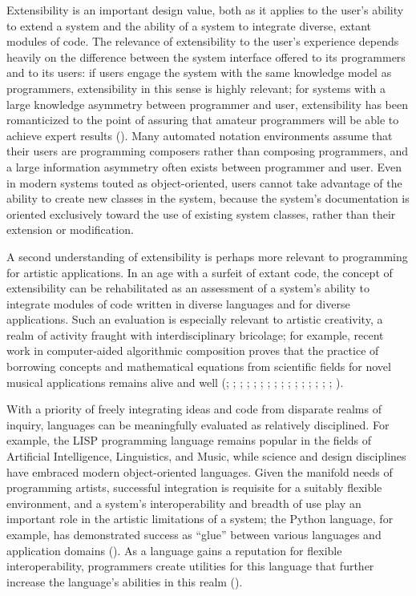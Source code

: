 Extensibility is an important design value, both as it applies to the user's ability to extend a system and the ability of a system to integrate diverse, extant modules of code. The relevance of extensibility to the user's experience depends heavily on the difference between the system interface offered to its programmers and to its users: if users engage the system with the same knowledge model as programmers, extensibility in this sense is highly relevant; for systems with a large knowledge asymmetry between programmer and user, extensibility has been romanticized to the point of assuring that amateur programmers will be able to achieve expert results (\cite{Standish:1975gd}). Many automated notation environments assume that their users are programming composers rather than composing programmers, and a large information asymmetry often exists between programmer and user. Even in modern systems touted as object-oriented, users cannot take advantage of the ability to create new classes in the system, because the system's documentation is oriented exclusively toward the use of existing system classes, rather than their extension or modification. 

A second understanding of extensibility is perhaps more relevant to programming for artistic applications. In an age with a surfeit of extant code, the concept of extensibility can be rehabilitated as an assessment of a system's ability to integrate modules of code written in diverse languages and for diverse applications. Such an evaluation is especially relevant to artistic creativity, a realm of activity fraught with interdisciplinary bricolage; for example, recent work in computer-aided algorithmic composition proves that the practice of borrowing concepts and mathematical equations from scientific fields for novel musical applications remains alive and well (\cite{Magnus2010}; \cite{Washka:zp}; \cite{Zad2005}; \cite{Acevedo2005}; \cite{Gartland-Jones2003}; \cite{Phon-Amnuaisuk1999}; \cite{Wiggins1998a}; \cite{MIRANDA2007}; \cite{Burraston2004}; \cite{Kroger}; \cite{Laine1988}; \cite{Hornel}; \cite{Melo2003}; \cite{Spicer2004}; \cite{Luque2009}; \cite{Peters2010}; \cite{essl2006circle}). 

With a priority of freely integrating ideas and code from disparate realms of inquiry, languages can be meaningfully evaluated as relatively disciplined. For example, the LISP programming language remains popular in the fields of Artificial Intelligence, Linguistics, and Music, while science and design disciplines have embraced modern object-oriented languages. Given the manifold needs of programming artists, successful integration is requisite for a suitably flexible environment, and a system's interoperability and breadth of use play an important role in the artistic limitations of a system; the Python language, for example, has demonstrated success as ``glue'' between various languages and application domains (\cite{Sanner:1999rp}). As a language gains a reputation for flexible interoperability, programmers create utilities for this language that further increase the language's abilities in this realm (\cite{beazley1996swig}).

